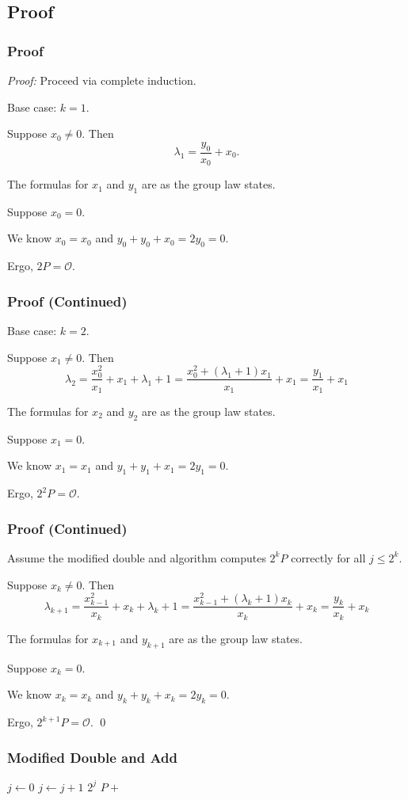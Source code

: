 \documentclass[xcolor=pdftex,dvipsnames,table]{beamer}
\theoremstyle{plain}
\theoremstyle{definition}
\def\NN{\mathbb{N}}
\begin{document}
\subsection[Proof]{Proof}
\begin{frame}
	\frametitle{Proof}
	
	\textit{Proof:} Proceed via complete induction.
	
	Base case: $k=1$.
	
	Suppose $x_0\neq 0$.
	Then 
	\[
	\lambda_1=\frac{y_{0}}{x_{0}}+x_{0}.
	\]

	The formulas for $x_1$ and $y_1$ are as the group law states.

	Suppose $x_0=0$.
	
	We know $x_0=x_0$ and $y_0+y_0+x_0=2y_0=0$.
	
	Ergo, $2P=\mathcal{O}$.
\end{frame}
\begin{frame}
	\frametitle{Proof (Continued)}
	
	Base case: $k=2$.
	
	Suppose $x_1\neq 0$.
	Then 
	\[
	\lambda_{2}=\frac{x_{0}^2}{x_{1}}+x_{1}+\lambda_{1}+1=
	\frac{x_{0}^2+(\lambda_{1}+1)x_{1}}{x_{1}}+x_{1}=\frac{y_{1}}{x_{1}}+x_{1}
	\]
	
	The formulas for $x_2$ and $y_2$ are as the group law states.
	
	Suppose $x_1=0$.
	
	We know $x_1=x_1$ and $y_1+y_1+x_1=2y_1=0$.
	
	Ergo, $2^2P=\mathcal{O}$.
\end{frame}
\begin{frame}
	\frametitle{Proof (Continued)}
	
	Assume the modified double and algorithm computes $2^kP$ correctly for all $j\leq 2^{k}$.
	
	Suppose $x_k\neq 0$.
	Then 
	\[
	\lambda_{k+1}=\frac{x_{k-1}^2}{x_{k}}+x_{k}+\lambda_{k}+1=
	\frac{x_{k-1}^2+(\lambda_{k}+1)x_{k}}{x_{k}}+x_{k}=\frac{y_{k}}{x_{k}}+x_{k}
	\]
	
	The formulas for $x_{k+1}$ and $y_{k+1}$ are as the group law states.
	
	Suppose $x_k=0$.
	
	We know $x_k=x_k$ and $y_k+y_k+x_k=2y_k=0$.
	
	Ergo, $2^{k+1}P=\mathcal{O}$. 
	{\flushright\qed}
\end{frame}

\begin{frame}
	\frametitle{Modified Double and Add}
	
	\begin{algorithmic}
		\Function{DoubleAdd2}{$m\in\NN$, $P\in E$}
		 
		 
		\EndIf
		\State $j\gets 0$
		 $j\gets j+1$
		\EndWhile
		\State \Return $2^j$ 
		\Else
		\State \Return $P+$
		\EndIf
		\EndFunction
	\end{algorithmic}
\end{frame}
\end{document}
